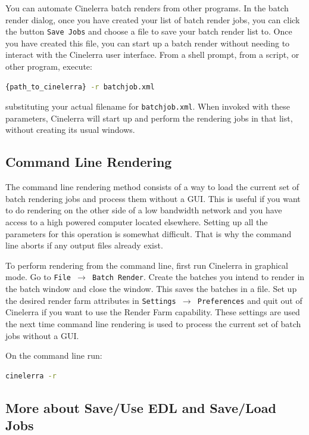 You can automate Cinelerra batch renders from other programs.  In the batch render dialog, once you have created your list of batch render jobs, you can click the button \texttt{Save Jobs} and choose a file to save your batch render list to.  Once you have created this file, you can start up a batch render without needing to interact with the Cinelerra user interface.  From a shell prompt, from a script, or other program, execute:

\begin{lstlisting}[language=bash,numbers=none]
    {path_to_cinelerra} -r batchjob.xml
\end{lstlisting}
substituting  your actual filename for \texttt{batchjob.xml}.  When invoked with these parameters, Cinelerra will start up and perform the rendering jobs in that list, without creating its usual windows.

\subsection{Command Line Rendering}%
\label{sub:command_line_rendering}

The command line rendering method consists of a way to load the current set of batch rendering jobs and process them without a GUI. This is useful if you want to do rendering on the other side of a low bandwidth network and you have access to a high powered computer located elsewhere. Setting up all the parameters for this operation is somewhat difficult. That is why the command line aborts if any output files already exist.

To perform rendering from the command line, first run Cinelerra in graphical mode. Go to \texttt{File $\rightarrow$ Batch Render}. Create the batches you intend to render in the batch window and close the window. This saves the batches in a file. Set up the desired render farm attributes in \texttt{Settings $\rightarrow$ Preferences} and quit out of Cinelerra if you want to use the Render Farm capability.  These settings are used the next time command line rendering is used to process the current set of batch jobs without a GUI.

On the command line run:

\begin{lstlisting}[language=bash,numbers=none]
cinelerra -r
\end{lstlisting}

\subsection{More about Save/Use EDL and Save/Load Jobs}%
\label{sub:more_save_use_edl_jobs}

